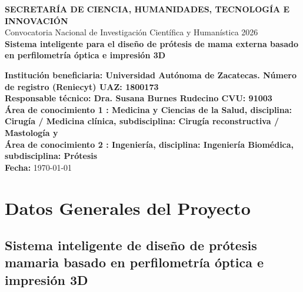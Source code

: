 \documentclass[12pt,a4paper]{article}
\begin{document}
\begin{titlepage}
    \centering
    
    
    {\large \textbf{SECRETARÍA DE CIENCIA, HUMANIDADES, TECNOLOGÍA E INNOVACIÓN}}\\[0.5cm]
    {\normalsize Convocatoria Nacional de Investigación Científica y Humanística 2026}\\[2cm]

    {\Huge \textbf{Sistema inteligente para el diseño de prótesis de mama externa basado en perfilometría óptica e impresión 3D}}\\[1.5cm]

    \begin{flushleft}
    \textbf{Institución beneficiaria: Universidad Autónoma de Zacatecas. Número de registro (Reniecyt) UAZ: 1800173} \\[0.2cm]
    \textbf{Responsable técnico: Dra. Susana Burnes Rudecino CVU: 91003} \\[0.2cm]
    \textbf{Área de conocimiento 1 : Medicina y Ciencias de la Salud, disciplina: Cirugía / Medicina clínica, subdisciplina: Cirugía reconstructiva / Mastología y } \\[0.2cm]
    \textbf{Área de conocimiento 2 : Ingeniería, disciplina: Ingeniería Biomédica, subdisciplina: Prótesis} \\[0.2cm]
    \textbf{Fecha:} \today
    \end{flushleft}

    \vfill

\end{titlepage}

\tableofcontents
\newpage

\section{Datos Generales del Proyecto}

\subsection{Sistema inteligente de diseño de prótesis mamaria basado en perfilometría óptica e impresión 3D}
\end{document}
